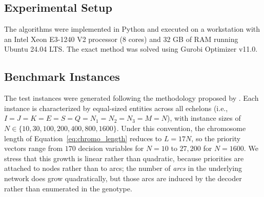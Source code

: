 \documentclass[preprint,12pt,authoryear]{elsarticle}
\begin{document}

\subsection{Experimental Setup}
\label{subsec:setup}

The algorithms were implemented in Python and executed on a workstation with an Intel Xeon E3-1240 V2 processor (8 cores) and 32 GB of RAM running Ubuntu 24.04 LTS. The exact method
was solved using Gurobi Optimizer v11.0.


\subsection{Benchmark Instances}
\label{subsec:instances}

The test instances were generated following the methodology proposed by \cite{rajabi2023}. Each instance is characterized by equal-sized entities across all echelons
(i.e., $I = J = K = E = S = Q = N_1 = N_2 = N_3 = M = N$), with instance sizes of $N \in \{10, 30, 100, 200, 400, 800, 1600\}$. Under this convention, the chromosome length of
Equation~\eqref{eq:chromo_length} reduces to $L = 17N$, so the priority vectors range from $170$ decision variables for $N = 10$ to $27{,}200$ for $N = 1600$. We stress that this
growth is linear rather than quadratic, because priorities are attached to nodes rather than to arcs; the number of \emph{arcs} in the underlying network does grow quadratically,
but those arcs are induced by the decoder rather than enumerated in the genotype.
\end{document}
